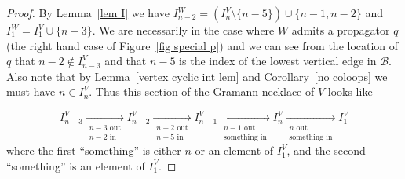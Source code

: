 \documentclass[11pt]{article}
\theoremstyle{remark}
\theoremstyle{definition}
\begin{document}
\begin{proof}
  By Lemma~\ref{lem I} we have $I_{n-2}^{W}= (I_{n}^{V} \setminus \{n-5\})\cup \{n-1,n-2\}$ and $I_1^W = I_1^V\cup \{n-3\}$. We are necessarily in the case where $W$ admits a propagator $q$ (the right hand case of Figure~\ref{fig special p}) and we can see from the location of $q$ that $n-2\not\in I_{n-3}^{V}$ and that $n-5$ is the index of the lowest vertical edge in $\mathcal{B}$.  Also note that by Lemma~\ref{vertex cyclic int lem} and Corollary~\ref{no coloops} we must have $n\in I_n^V$. Thus this section of the Gramann necklace of $V$ looks like

  \begin{equation}\label{eq necklace}
  I_{n-3}^{V} \xrightarrow[\substack{n-3\text{ out}\\n-2\text{ in}}]{} I_{n-2}^{V} \xrightarrow[\substack{n-2\text{ out}\\n-5\text{ in}}]{} I_{n-1}^{V} \xrightarrow[\substack{n-1\text{ out}\\\text{something in}}]{} I_{n}^{V}  \xrightarrow[\substack{n \text{ out}\\\text{something in}}]{} I_1^{V}
  \end{equation}
  where the first ``something'' is either $n$ or an element of $I_1^{V}$, and the second ``something'' is an element of $I_1^{V}$.


\end{proof}
\end{document}
